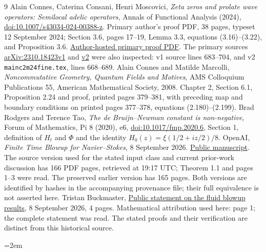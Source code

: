 \documentclass[11pt,a4paper]{article}
\theoremstyle{definition}
\theoremstyle{plain}
\begin{document}
\begin{thebibliography}{9}
 Alain Connes, Caterina Consani, Henri Moscovici,
\emph{Zeta zeros and prolate wave operators: Semilocal adelic operators},
Annals of Functional Analysis (2024),
\href{https://doi.org/10.1007/s43034-024-00388-z}{doi:10.1007/s43034-024-00388-z}.
Primary author's proof PDF, 38 pages, typeset 12 September 2024;
Section 3.6, pages 17--19, Lemma 3.3, equations (3.16)--(3.22),
and Proposition 3.6.
\href{https://alainconnes.org/wp-content/uploads/Zeta-zeros-and-prolateproofs-final-2024.pdf}{Author-hosted primary proof PDF}.
The primary sources
\href{https://arxiv.org/abs/2310.18423v1}{arXiv:2310.18423v1}
and \href{https://arxiv.org/abs/2310.18423v2}{v2} were also inspected:
v1 source lines 683--704, and v2
\texttt{mainc2m24fine.tex}, lines 668--689.
 Alain Connes and Matilde Marcolli,
\emph{Noncommutative Geometry, Quantum Fields and Motives},
AMS Colloquium Publications 55, American Mathematical Society, 2008.
Chapter 2, Section 6.1, Proposition 2.24 and proof,
printed pages 379--381, with preceding map and boundary conditions
on printed pages 377--378, equations (2.180)--(2.199).
 Brad Rodgers and Terence Tao,
\emph{The de Bruijn--Newman constant is non-negative},
Forum of Mathematics, Pi 8 (2020), e6,
\href{https://doi.org/10.1017/fmp.2020.6}{doi:10.1017/fmp.2020.6},
Section 1, definition of $H_t$ and $\Phi$ and the identity
$H_0(z)=\xi(1/2+iz/2)/8$.
 OpenAI,
\emph{Finite Time Blowup for Navier--Stokes}, 8 September 2026.
\href{https://cdn.openai.com/pdf/32d9f210-8b73-45e0-91bc-82a30aef8a9a/navier-stokes.pdf}{Public manuscript}.
The source version used for the stated input class and current
prior-work discussion has 166 PDF pages, retrieved at 19:17 UTC;
Theorem 1.1 and pages 1--3 were read. The preserved earlier version has
165 pages. Both versions are identified by hashes in the accompanying
provenance file; their full equivalence is not asserted here.
 Tristan Buckmaster,
\href{https://cims.nyu.edu/~tristanb/statement.pdf}{Public statement
on the fluid blowup results}, 8 September 2026, 4 pages.
Mathematical attribution used here: page 1; the complete statement was
read. The stated proofs and their verification are distinct from this
historical source.
\end{thebibliography}
\appendix

\begingroup
\emergencystretch=2em

\endgroup
\clearpage

\clearpage

\clearpage

\clearpage

\clearpage

\clearpage

\end{document}
